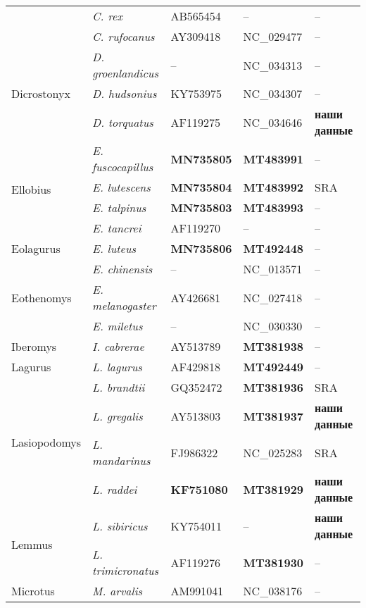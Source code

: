 \begin{landscape}
\begin{center}
\begin{longtable}{|p{3.5cm}|p{4.5cm}|p{4.0cm}|p{6.5cm}|p{4.5cm}|}
& \textit{C. rex} & AB565454 & -- & --\\ \cline{2-5}
& \textit{C. rufocanus} & AY309418 & NC\_029477 & --\\ \hline
\multirow{3}{*}{Dicrostonyx} & \textit{D. groenlandicus} & -- & NC\_034313 & --\\ \cline{2-5}
& \textit{D. hudsonius} & KY753975 & NC\_034307 & --\\ \cline{2-5}
& \textit{D. torquatus} & AF119275 & NC\_034646 & \textbf{наши данные}\\ \hline
\multirow{4}{*}{Ellobius} & \textit{E. fuscocapillus} & \textbf{MN735805} & \textbf{MT483991} & --\\ \cline{2-5}
& \textit{E. lutescens} & \textbf{MN735804} & \textbf{MT483992} & SRA\\ \cline{2-5}
& \textit{E. talpinus} & \textbf{MN735803} & \textbf{MT483993} & --\\ \cline{2-5}
& \textit{E. tancrei} & AF119270 & -- & --\\ \hline
Eolagurus & \textit{E. luteus} & \textbf{MN735806} & \textbf{MT492448} & --\\ \hline
\multirow{3}{*}{Eothenomys} & \textit{E. chinensis} & -- & NC\_013571 & --\\ \cline{2-5}
& \textit{E. melanogaster} & AY426681 & NC\_027418 & --\\ \cline{2-5}
& \textit{E. miletus} & -- & NC\_030330 & --\\ \hline
Iberomys & \textit{I. cabrerae} & AY513789 & \textbf{MT381938} & --\\ \cline{2-5}
Lagurus & \textit{L. lagurus} & AF429818 & \textbf{MT492449} & --\\ \hline
\multirow{4}{*}{Lasiopodomys} & \textit{L. brandtii} & GQ352472 & \textbf{MT381936} & SRA\\ \cline{2-5}
& \textit{L. gregalis} & AY513803 & \textbf{MT381937} & \textbf{наши данные}\\ \cline{2-5}
& \textit{L. mandarinus} & FJ986322 & NC\_025283 & SRA\\ \cline{2-5}
& \textit{L. raddei} & \textbf{KF751080} & \textbf{MT381929} & \textbf{наши данные}\\ \hline
\multirow{2}{*}{Lemmus} & \textit{L. sibiricus} & KY754011 & -- & \textbf{наши данные}\\ \cline{2-5}
& \textit{L. trimicronatus} & AF119276 & \textbf{MT381930} & --\\ \hline
\multirow{5}{*}{Microtus} & \textit{M. arvalis} & AM991041 & NC\_038176 & --\\ \cline{2-5}

\end{longtable}
\end{center}
\end{landscape}
